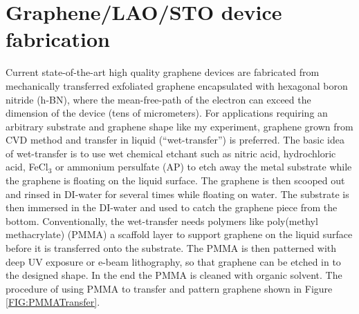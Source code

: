 \documentclass[pdflatex, sectionletters, 12pt]{pittetd}    %
\begin{document}


\section{Graphene/LAO/STO device fabrication}

Current state-of-the-art high quality graphene devices are fabricated from mechanically transferred exfoliated graphene encapsulated with hexagonal boron nitride (h-BN)\cite{dean2010naturenano}, where the mean-free-path of the electron can exceed the dimension of the device\cite{Novoselovaac9439} (tens of micrometers). For applications requiring an arbitrary substrate and graphene shape like my experiment, graphene grown from CVD method and transfer in liquid (``wet-transfer'') is preferred. The basic idea of wet-transfer is to use wet chemical etchant such as nitric acid, hydrochloric acid, FeCl$_3$ or ammonium persulfate (AP) to etch away the metal substrate while the graphene is floating on the liquid surface. The graphene is then scooped out and rinsed in DI-water for several times while floating on water. The substrate is then immersed in the DI-water and used to catch the graphene piece from the bottom. Conventionally, the wet-transfer needs polymers like poly(methyl methacrylate) (PMMA) a scaffold layer to support  graphene on the liquid surface before it is transferred onto the substrate\cite{li2009transfer, reina2008transferring, reina2008large}. The PMMA is then patterned with deep UV exposure or e-beam lithography, so that graphene can be etched in to the designed shape. In the end the PMMA is cleaned with organic solvent. The procedure of using PMMA to transfer and pattern graphene shown in Figure \ref{FIG:PMMATransfer}. 
\end{document}
